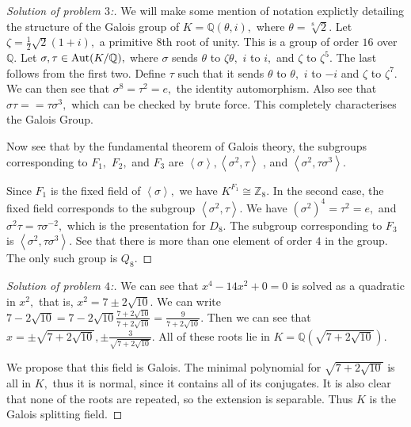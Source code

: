 \documentclass[letterpaper,11pt,twoside]{article}
\theoremstyle{proposition}
\theoremstyle{definition}
\theoremstyle{theorem}
\theoremstyle{definition}
\theoremstyle{definition}
\theoremstyle{definition}
\theoremstyle{lemma}
\theoremstyle{definition}
\theoremstyle{definition}
\theoremstyle{corollary}
\theoremstyle{definition}
\theoremstyle{definition}
\theoremstyle{definition}
\newcommand{\gen}[1]{\left\langle #1\right\rangle}
\DeclareMathOperator{\Aut}{\text{\rm Aut}}
\begin{document}
\begin{proof}[Solution of problem $3$:]
We will make some mention of notation explictly detailing the structure of the Galois group of $K=\mathbb{Q}(\theta, i),$ where $\theta = \sqrt[8]{2}.$ Let 
$\zeta= \frac{1}{2}\sqrt{2}(1+i),$ a primitive $8$th root of unity. This is a group of order $16$ over $\mathbb{Q}.$ Let $\sigma, \tau \in \Aut(K/ 
\mathbb{Q}),$ where $\sigma$ sends $\theta$ to $ \zeta \theta,$ $i$ to $i,$ and $\zeta$ to $\zeta^5.$ The last follows from the first two. Define $\tau$ 
such that it sends $\theta$ to $\theta,$ $i$ to $-i$ and $\zeta $ to $\zeta^7.$ We can then see that $\sigma^8=\tau^2=e,$ the identity automorphism. Also 
see that $ \sigma \tau == \tau \sigma^3,$ which can be checked by brute force. This completely characterises the Galois Group. 

Now see that by the fundamental theorem of Galois theory, the subgroups corresponding to $F_1,$ $F_2,$ and $F_3$ are $\gen{\sigma}, \gen{\sigma^2, \tau}$ , 
and $ \gen{\sigma^2, \tau \sigma^3}.$ 

Since $F_1$ is the fixed field of $\gen{\sigma},$ we have $K^{F_1} \cong \mathbb{Z}_8.$ In the second case, the fixed field corresponds to the subgroup 
$\gen{\sigma^2, \tau}.$ We have $(\sigma^2)^4=\tau^2=e,$ and $\sigma^2 \tau = \tau \sigma^{-2},$ which is the presentation for $D_8.$ The subgroup 
corresponding to $F_3$ is $\gen{\sigma^2, \tau \sigma^3}.$ See that there is more than one element of order $4$ in the group. The only such group is $Q_8.$
\end{proof}
\begin{proof}[Solution of problem $4$:]
		We can see that $x^4-14x^2+0=0$ is solved as a quadratic in $x^2,$ that is, $x^2= 7 \pm 2 \sqrt{10}.$ 
	We can write $7 -2 \sqrt{10}= 7-2\sqrt{10}\frac{7+2\sqrt{10}}{7+2\sqrt{10}}= \frac{9}{7+2\sqrt{10}}.$ 
	Then we can see that $x= \pm \sqrt{7+2\sqrt{10}}, \pm \frac{3}{\sqrt{7+2\sqrt{10}}}.$ All of these roots lie in $K=\mathbb{Q}(\sqrt{7+2\sqrt{10}}).$
	
	We propose that this field is Galois. The minimal polynomial for $\sqrt{7+2\sqrt{10}}$ is all in $K,$ thus it is normal, since it contains all of its 
	conjugates. It is also clear that none of the roots are repeated, so the extension is separable. Thus $K$ is the Galois splitting field.
\end{proof}
\end{document}
